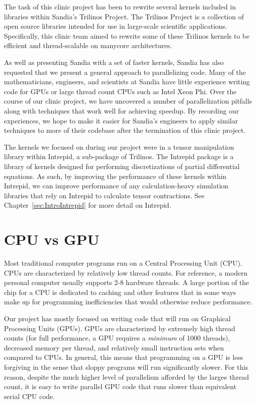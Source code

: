 The task of this clinic project has been to rewrite several kernels included in
libraries within Sandia's Trilinos Project. The Trilinos Project is a
collection of open source libraries intended for use in large-scale scientific
applications. Specifically, this clinic team aimed to rewrite some of these Trilinos kernels to be
efficient and thread-scalable on manycore architectures.

As well as presenting Sandia with a set of faster kernels, Sandia has also
requested that we present a general approach to parallelizing code. Many of the
mathematicians, engineers, and scientists at Sandia have little experience
writing code for GPUs or large thread count CPUs such as Intel Xeon Phi. Over
the course of our clinic project, we have uncovered a number of parallelization pitfalls 
along with techniques that work well for achieving speedup. By recording our experiences, we hope to
make it easier for Sandia's engineers to apply similar techniques to more of
their codebase after the termination of this clinic project.

The kernels we focused on during our project were in a tensor manipulation
library within Intrepid, a sub-package of Trilinos. The Intrepid package is a
library of kernels designed for performing discretizations of partial
differential equations. As such, by improving the performance of these kernels
within Intrepid, we can improve performance of any calculation-heavy simulation
libraries that rely on Intrepid to calculate tensor contractions. See
Chapter~\ref{sec:IntroIntrepid} for more detail on Intrepid.

\section{CPU vs GPU} \label{CPU-GPU}

Most traditional computer programs run on a Central Processing Unit (CPU). CPUs
are characterized by relatively low thread counts. For reference, a modern personal computer
usually supports 2-8 hardware threads. A large portion of the chip for a CPU is
dedicated to caching and other features that in some ways make up for
programming inefficiencies that would otherwise reduce performance.

Our project has mostly focused on writing code that will run on Graphical
Processing Units (GPUs). GPUs are characterized by extremely high thread counts
(for full performance, a GPU requires a \emph{minimum} of 1000 threads),
decreased memory per thread, and relatively small instruction sets when compared
to CPUs. In general, this means that programming on a GPU is less forgiving in the 
sense that sloppy programs will run significantly slower. For this reason,
despite the much higher level of parallelism afforded by the largee thread
count, it is easy to write parallel GPU code that runs slower than
equivalent serial CPU code.

